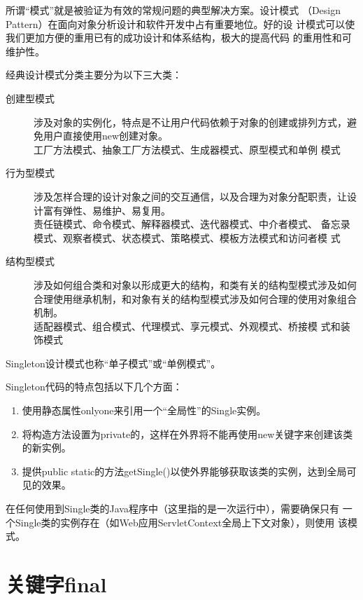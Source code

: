 所谓“模式”就是被验证为有效的常规问题的典型解决方案。{\hei 设计模式
  （Design Pattern）}在面向对象分析设计和软件开发中占有重要地位。好的设
计模式可以使我们更加方便的重用已有的成功设计和体系结构，极大的提高代码
的重用性和可维护性。

经典设计模式分类主要分为以下三大类：

\begin{description}
\item[创建型模式] 涉及对象的实例化，特点是不让用户代码依赖于对象的创建或排列方式，避免用户直接使用new创建对象。\\
  {\Red\kai 工厂方法模式、抽象工厂方法模式、生成器模式、原型模式和单例
    模式}
\item[行为型模式] 涉及怎样合理的设计对象之间的交互通信，以及合理为对象分配职责，让设计富有弹性、易维护、易复用。\\
  {\Blue\kai 责任链模式、命令模式、解释器模式、迭代器模式、中介者模式、
    备忘录模式、观察者模式、状态模式、策略模式、模板方法模式和访问者模
    式}
\item[结构型模式] 涉及如何组合类和对象以形成更大的结构，和类有关的结构型模式涉及如何合理使用继承机制，和对象有关的结构型模式涉及如何合理的使用对象组合机制。\\
  {\Mage\kai 适配器模式、组合模式、代理模式、享元模式、外观模式、桥接模
    式和装饰模式}
\end{description}


Singleton设计模式也称“单子模式”或“单例模式”。


Singleton代码的特点包括以下几个方面：

\begin{enumerate}
\item 使用静态属性onlyone来引用一个“全局性”的Single实例。
\item 将构造方法设置为private的，这样在外界将不能再使用new关键字来创建该类的新实例。
\item 提供public static的方法getSingle()以使外界能够获取该类的实例，达到全局可见的效果。
\end{enumerate}

在任何使用到Single类的Java程序中（这里指的是一次运行中），需要确保只有
一个Single类的实例存在（如Web应用ServletContext全局上下文对象），则使用
该模式。

\section{关键字final}

